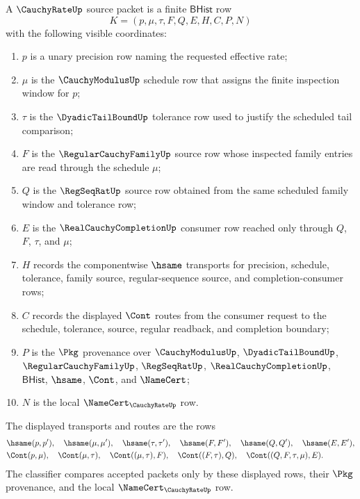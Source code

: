 \begin{definition}
\label{def:cauchy-rate-bhist-source}
A $\CauchyRateUp$ source packet is a finite $\mathsf{BHist}$ row
$$
K=(p,\mu,\tau,F,Q,E,H,C,P,N)
$$
with the following visible coordinates:
\begin{enumerate}
\item $p$ is a unary precision row naming the requested effective rate;
\item $\mu$ is the $\CauchyModulusUp$ schedule row that assigns the finite inspection window for $p$;
\item $\tau$ is the $\DyadicTailBoundUp$ tolerance row used to justify the scheduled tail comparison;
\item $F$ is the $\RegularCauchyFamilyUp$ source row whose inspected family entries are read through the schedule $\mu$;
\item $Q$ is the $\RegSeqRatUp$ source row obtained from the same scheduled family window and tolerance row;
\item $E$ is the $\RealCauchyCompletionUp$ consumer row reached only through $Q$, $F$, $\tau$, and $\mu$;
\item $H$ records the componentwise $\hsame$ transports for precision, schedule, tolerance, family source, regular-sequence source, and completion-consumer rows;
\item $C$ records the displayed $\Cont$ routes from the consumer request to the schedule, tolerance, source, regular readback, and completion boundary;
\item $P$ is the $\Pkg$ provenance over $\CauchyModulusUp$, $\DyadicTailBoundUp$, $\RegularCauchyFamilyUp$, $\RegSeqRatUp$, $\RealCauchyCompletionUp$, $\mathsf{BHist}$, $\hsame$, $\Cont$, and $\NameCert$;
\item $N$ is the local $\NameCert_{\CauchyRateUp}$ row.
\end{enumerate}
The displayed transports and routes are the rows
$$
\begin{aligned}
&\hsame(p,p'),\quad \hsame(\mu,\mu'),\quad \hsame(\tau,\tau'),\quad
\hsame(F,F'),\quad \hsame(Q,Q'),\quad \hsame(E,E'),\\
&\Cont(p,\mu),\quad \Cont(\mu,\tau),\quad \Cont((\mu,\tau),F),\quad
\Cont((F,\tau),Q),\quad \Cont((Q,F,\tau,\mu),E).
\end{aligned}
$$
The classifier compares accepted packets only by these displayed rows, their $\Pkg$ provenance, and the local $\NameCert_{\CauchyRateUp}$ row.
\end{definition}

